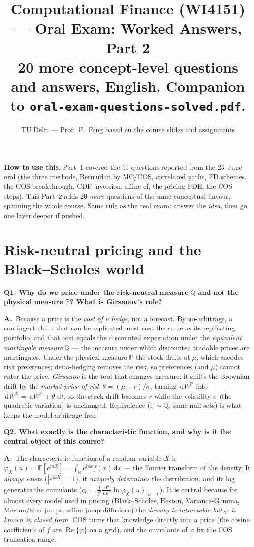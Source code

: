 \documentclass[11pt]{article}
\title{\textbf{Computational Finance (WI4151) --- Oral Exam: Worked Answers, Part 2}\\[3pt]
\large 20 more concept-level questions and answers, English. Companion to
\texttt{oral-exam-questions-solved.pdf}.}
\author{TU Delft --- Prof.\ F.\ Fang \quad\textbar\quad based on the course slides and assignments}
\date{}
\newcommand{\R}{\mathbb{R}}
\newcommand{\E}{\mathbb{E}}
\newcommand{\Prob}{\mathbb{P}}
\newcommand{\Q}{\mathbb{Q}}
\newcommand{\Real}{\operatorname{Re}}
\newcommand{\ii}{\mathrm{i}}
\newcommand{\dd}{\,\mathrm{d}}
\newcommand{\ch}{\varphi}
\newcommand{\Qq}[1]{\bigskip\noindent\textbf{\large #1}\par\nobreak\smallskip}
\newcommand{\A}{\noindent\textbf{A.}\ }
\begin{document}
\maketitle
\vspace{-1.2em}

\begin{keybox}
\textbf{How to use this.} Part~1 covered the 11 questions reported from the 23~June oral (the three methods,
Bermudan by MC/COS, correlated paths, FD schemes, the COS breakthrough, CDF inversion, affine cf, the pricing
PDE, the COS steps). This Part~2 adds 20 \emph{more} questions of the same conceptual flavour, spanning the
whole course. Same rule as the real exam: answer the \emph{idea}, then go one layer deeper if pushed.
\end{keybox}

\tableofcontents
\bigskip

\section{Risk-neutral pricing and the Black--Scholes world}

\Qq{Q1. Why do we price under the risk-neutral measure $\Q$ and not the physical measure $\Prob$? What is Girsanov's role?}
\A Because a price is the \emph{cost of a hedge}, not a forecast. By no-arbitrage, a contingent claim that can be
replicated must cost the same as its replicating portfolio, and that cost equals the discounted expectation
under the \emph{equivalent martingale measure} $\Q$ --- the measure under which discounted tradable prices are
martingales. Under the physical measure $\Prob$ the stock drifts at $\mu$, which encodes risk preferences;
delta-hedging removes the risk, so preferences (and $\mu$) cannot enter the price. \emph{Girsanov} is the tool
that changes measure: it shifts the Brownian drift by the \emph{market price of risk} $\theta=(\mu-r)/\sigma$,
turning $\dd W^{\Prob}$ into $\dd W^{\Q}=\dd W^{\Prob}+\theta\,\dd t$, so the stock drift becomes $r$ while the
volatility $\sigma$ (the quadratic variation) is unchanged. Equivalence ($\Prob\sim\Q$, same null sets) is what
keeps the model arbitrage-free.

\Qq{Q2. What exactly is the characteristic function, and why is it the central object of this course?}
\A The characteristic function of a random variable $X$ is $\ch_X(u)=\E[e^{\ii uX}]=\int_\R e^{\ii ux}f(x)\dd x$
--- the Fourier transform of the density. It \emph{always exists} ($|e^{\ii uX}|=1$), it \emph{uniquely
determines} the distribution, and its log generates the cumulants
($c_n=\frac{1}{\ii^n}\frac{\dd^n}{\dd u^n}\ln\ch_X(u)\big|_{u=0}$). It is central because for almost every model
used in pricing (Black--Scholes, Heston, Variance-Gamma, Merton/Kou jumps, affine jump-diffusions) the
\emph{density is intractable but $\ch$ is known in closed form}. COS turns that knowledge directly into a price
(the cosine coefficients of $f$ are $\Real\{\ch\}$ on a grid), and the cumulants of $\ch$ fix the COS truncation
range.
\end{document}
